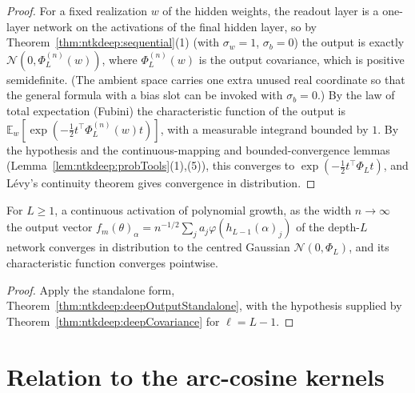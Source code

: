 \begin{proof}
  \leanok
For a fixed realization $w$ of the hidden weights, the readout layer is a one-layer network on the activations of the final hidden layer, so by Theorem~\ref{thm:ntkdeep:sequential}(1) (with $\sigma_w=1$, $\sigma_b=0$) the output is exactly $\mathcal N(0,\Phi^{(n)}_L(w))$, where $\Phi^{(n)}_L(w)$ is the output covariance, which is positive semidefinite. (The ambient space carries one extra unused real coordinate so that the general formula with a bias slot can be invoked with $\sigma_b=0$.)
By the law of total expectation (Fubini) the characteristic function of the output is $\mathbb E_w[\exp(-\frac12t^\top\Phi^{(n)}_L(w)t)]$, with a measurable integrand bounded by $1$. By the hypothesis and the continuous-mapping and bounded-convergence lemmas (Lemma~\ref{lem:ntkdeep:probTools}(1),(5)), this converges to $\exp(-\frac12t^\top\Phi_Lt)$, and L\'evy's continuity theorem gives convergence in distribution.
\end{proof}

\begin{theorem}\label{thm:ntkdeep:deepOutput}
  \leanok
For $L\ge1$, a continuous activation of polynomial growth, as the width $n\to\infty$ the output vector $f_m(\theta)_\alpha=n^{-1/2}\sum_ja_j\varphi(h_{L-1}(\alpha)_j)$ of the depth-$L$ network converges in distribution to the centred Gaussian $\mathcal N(0,\Phi_L)$, and its characteristic function converges pointwise.
\end{theorem}

\begin{proof}
  \leanok
Apply the standalone form, Theorem~\ref{thm:ntkdeep:deepOutputStandalone}, with the hypothesis supplied by Theorem~\ref{thm:ntkdeep:deepCovariance} for $\ell=L-1$.
\end{proof}


\section{Relation to the arc-cosine kernels}\label{sec:ntkdeep:arccos}

